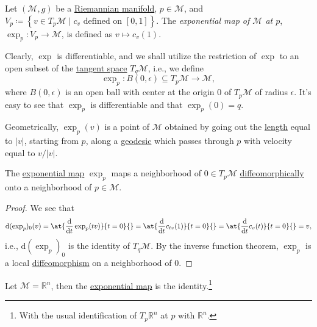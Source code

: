 \begin{definition}\label{def:exponential-map}
	Let \((\mathcal{M} , g)\) be a \hyperref[def:Riemannian-manifold]{Riemannian manifold}, \(p\in \mathcal{M} \), and \(V_p \coloneqq \left\{ v\in T_p \mathcal{M} \mid c_v \text{ defined on } [0, 1] \right\}\). The \emph{exponential map of \(\mathcal{M} \) at \(p\)}, \(\exp_p \colon V_p \to \mathcal{M} \), is defined as \(v \mapsto c_v(1)\).
\end{definition}

Clearly, \(\exp \) is differentiable, and we shall utilize the restriction of \(\exp \) to an open subset of the \hyperref[def:tangent-space]{tangent space} \(T_q \mathcal{M} \), i.e., we define
\[
	\exp _p\colon B(0, \epsilon ) \subseteq T_p \mathcal{M} \to \mathcal{M} ,
\]
where \(B(0, \epsilon ) \) is an open ball with center at the origin \(0\) of \(T_p \mathcal{M} \) of radius \(\epsilon \). It's easy to see that \(\exp _p\) is differentiable and that \(\exp _p(0) = q\).

\begin{intuition}
	Geometrically, \(\exp _p(v)\) is a point of \(\mathcal{M} \) obtained by going out the \hyperref[def:length]{length} equal to \(\vert v \vert \), starting from \(p\), along a \hyperref[def:geodesic]{geodesic} which passes through \(p\) with velocity equal to \(v / \vert v \vert \).
\end{intuition}

\begin{proposition}
	The \hyperref[def:exponential-map]{exponential map} \(\exp _p\) maps a neighborhood of \(0\in T_p \mathcal{M} \) \hyperref[def:diffeomorphic]{diffeomorphically} onto a neighborhood of \(p\in \mathcal{M} \).
\end{proposition}
\begin{proof}
	We see that
	\[
		\mathrm{d} (\exp _p)_0(v)
		= \at{\frac{\mathrm{d}}{\mathrm{d}t} \exp _p(tv)}{t=0}{}
		= \at{\frac{\mathrm{d}}{\mathrm{d}t} c_{tv}(1)}{t=0}{}
		= \at{\frac{\mathrm{d}}{\mathrm{d}t} c_{v}(t)}{t=0}{}
		= v,
	\]
	i.e., \(\mathrm{d} (\exp _p)_0\) is the identity of \(T_q \mathcal{M} \). By the inverse function theorem, \(\exp _p\) is a local \hyperref[def:diffeomorphism]{diffeomorphism} on a neighborhood of \(0\).
\end{proof}

\begin{eg}
	Let \(\mathcal{M} = \mathbb{R} ^n\), then the \hyperref[def:exponential-map]{exponential map} is the identity.\footnote{With the usual identification of \(T_p \mathbb{R} ^n\) at \(p\) with \(\mathbb{R} ^n\).}
\end{eg}

